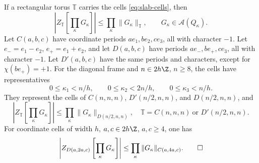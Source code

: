 \begin{proposition}\label{thm:slab-chessboard}
If a rectangular torus $\mathbb T$ carries the cells
\eqref{eq:slab-cells}, then
\begin{equation}\label{eq:slab-chessboard-rectangular}
 \left|Z_{\mathbb T}\left[\prod_{\kappa}G_\kappa\right]\right|
                       \le\prod_\kappa\|G_\kappa\|_{\mathbb T},
 \qquad G_\kappa\in\mathcal A(Q_\kappa).
\end{equation}
Let $C(a,b,c)$ have coordinate periods $ae_1,be_2,ce_3$,
all with character $-1$.
Let $e_-=e_1-e_2$, $e_+=e_1+e_2$, and let $D(a,b,c)$ have periods
$ae_-,be_+,ce_3$, all with character $-1$. Let $D'(a,b,c)$ have the
same periods and characters, except for $\chi(be_+)=+1$.
For the diagonal frame and $n\in2h\Z$, $n\ge8$, the cells have
representatives
\[
 0\le\kappa_1<n/h,\qquad 0\le\kappa_2<2n/h,
                     \qquad0\le\kappa_3<n/h.
\]
They represent the cells of $C(n,n,n)$, $D'(n/2,n,n)$, and
$D(n/2,n,n)$, and
\begin{equation}\label{eq:slab-chessboard-diagonal}
 \left|Z_{\mathbb T}\left[\prod_\kappa G_\kappa\right]\right|
           \le\prod_\kappa\|G_\kappa\|_{D(n/2,n,n)},
 \quad \mathbb T=C(n,n,n)\ \text{or }D'(n/2,n,n).
\end{equation}
For coordinate cells of width $h$, $a,c\in2h\Z$, $a,c\ge4$, one has
\begin{equation}\label{eq:slab-chessboard-coordinate}
 \left|Z_{D(a,2a,c)}\left[\prod_\kappa G_\kappa\right]\right|
                \le\prod_\kappa\|G_\kappa\|_{C(a,4a,c)}.\qedhere
\end{equation}
\end{proposition}

